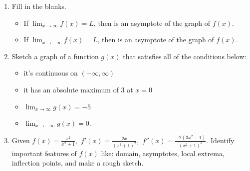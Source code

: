 \documentclass[11pt,fleqn]{article}
\begin{document}
\begin{enumerate}
\begin{enumerate}
		\end{enumerate}
 \newpage
 \item Fill in the blanks.
 \begin{itemize}
 	\item If $\displaystyle \lim_{x \to \infty} f(x)=L$, then \underline{\hspace{1.5in}} is an asymptote of the graph of $f(x).$
	\item If $\displaystyle \lim_{x \to -\infty} f(x)=L$, then \underline{\hspace{1.5in}} is an asymptote of the graph of $f(x).$
\end{itemize}
\item Sketch a graph of a function $g(x)$ that satisfies all of the conditions below:
\begin{itemize}
\item it's continuous on $(-\infty,\infty)$
\item it has an absolute maximum of 3 at $x=0$
\item $\displaystyle \lim_{x \to \infty} g(x)=-5$ 
\item $\displaystyle \lim_{x \to -\infty} g(x)=0.$
\end{itemize}

 \item Given $f(x)=\frac{x^2}{x^2+1},$ $f'(x)=\frac{2x}{(x^2+1)^2},$ $f''(x)= \frac{-2(3x^2-1)}{(x^2+1)^3}.$  Identify important features of $f(x)$ like: domain, asymptotes, local extrema, inflection points, and make a rough sketch.
 \vfill
 \end{enumerate}
\end{document}
